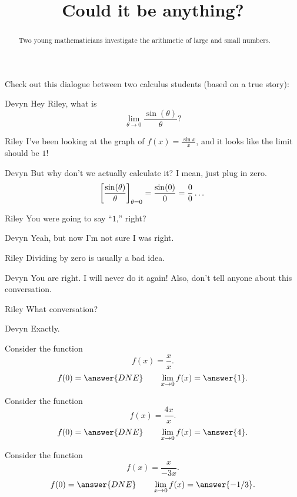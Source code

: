 \documentclass{ximera}
\title[Break-Ground:]{Could it be anything?}
\begin{document}
\begin{abstract}
Two young mathematicians investigate the arithmetic of large
and small numbers.
\end{abstract}
\maketitle


Check out this dialogue between two calculus students (based on a true
story):


\begin{dialogue}
\item[Devyn] Hey Riley, what is
  \[
  \lim_{\theta\to 0}\frac{\sin(\theta)}{\theta}?
  \]
\item[Riley] I've been looking at the graph of $f(x) = \frac{\sin x}{x}$, and it looks like the limit should be $1$!
\item[Devyn] But why don't we actually calculate it? I mean, just plug in zero. 
  \[
  \bigg[ \frac{\sin(\theta)}{\theta} \bigg]_{\theta=0} = \frac{\sin(0)}{0}=\frac{0}{0}\dots
  \]
  \item[Riley] You were going to say ``$1$,'' right? 
  \item[Devyn] Yeah, but now I'm not sure I was right.
  \item[Riley] Dividing by zero is usually a bad idea.
  \item[Devyn] You are right. I will never do it again! Also, don't
    tell anyone about this conversation.
  \item[Riley] What conversation?
  \item[Devyn] Exactly.
\end{dialogue}



\begin{problem}
  Consider the function
  \[
  f(x) = \frac{x}{x}.
  \]
  \[
  f(0) = \answer{DNE}\qquad\lim_{x\to 0} f(x) = \answer{1}.
  \]
\end{problem}

\begin{problem}
  Consider the function
  \[
  f(x) = \frac{4x}{x}.
  \]
  \[
  f(0) = \answer{DNE}\qquad\lim_{x\to 0} f(x) = \answer{4}.
  \]
\end{problem}

\begin{problem}
  Consider the function
  \[
  f(x) = \frac{x}{-3x}.
  \]
  \[
  f(0) = \answer{DNE}\qquad\lim_{x\to 0} f(x) = \answer{-1/3}.
  \]
\end{problem}

%
\end{document}
